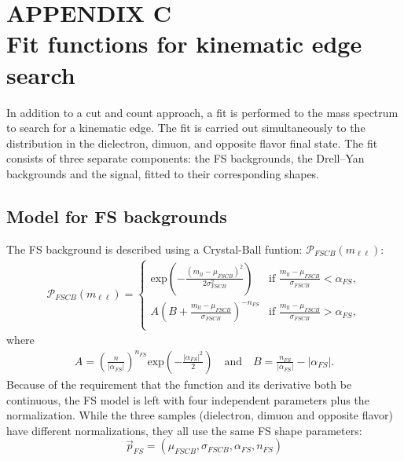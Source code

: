 \appendix %
\chapter*{APPENDIX C\\ Fit functions for kinematic edge search} %
\noindent\justify
{}
\setcounter{chapter}{1}
\label{sec:edgeFit}
\noindent\justify
In addition to a cut and count approach, a fit is performed to the mass spectrum to search for a kinematic edge. 
The fit is carried out simultaneously to the \mll distribution in the dielectron, dimuon, and opposite flavor final state. 
The fit consists of three separate components: the FS backgrounds, the Drell--Yan backgrounds and the signal, fitted to their corresponding shapes. 
\section*{Model for FS backgrounds}
\noindent\justify
The FS background is described using a Crystal-Ball funtion:
$\mathcal{P}_{FSCB}(m_{\ell\ell})$: 
\begin{eqnarray}
\mathcal{P}_{FSCB}(m_{\ell\ell}) = \begin{cases} 
\textrm{exp}\left(-\frac{(m_{ll}-\mu_{FSCB})^2}{2\sigma_{FSCB}^2}\right) &\mbox{if } \frac{m_{ll}-\mu_{FSCB}}{\sigma_{FSCB}}<\alpha_{FS}, \\
A (B+\frac{m_{ll}-\mu_{FSCB}}{\sigma_{FSCB}})^{-n_{FS}} &\mbox{if } \frac{m_{ll}-\mu_{FSCB}}{\sigma_{FSCB}}>\alpha_{FS}, \\
\end{cases}
\end{eqnarray}
where
\begin{eqnarray}
A = \left(\frac{n}{|\alpha_{FS}|}\right)^{n_{FS}} \textrm{exp}\left(-\frac{|\alpha_{FS}|^2}{2}\right) \quad \textrm{and}\quad B = \frac{n_{FS}}{|\alpha_{FS}|}-|\alpha_{FS}| .
\end{eqnarray}
Because of the requirement that the function and its derivative both be continuous, the FS model is left with four independent parameters plus the normalization.
While the three samples (dielectron, dimuon and opposite flavor) have different normalizations, they all use the same FS shape parameters: 
\begin{equation*}
\vec{p}_{FS} = (\mu_{FSCB},\sigma_{FSCB},\alpha_{FS},n_{FS})
\end{equation*}
